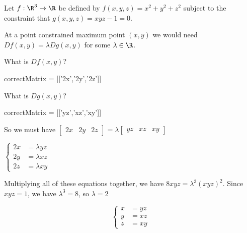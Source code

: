 \documentclass{ximera}
\begin{document}
	\begin{question}
		Let $f:\R^3 \to \R$ be defined by $f(x,y,z) = x^2+y^2+z^2$ subject to the constraint that $g(x,y,z) = xyz -1 = 0 $.  
		\begin{solution}
			\begin{hint}
			    At a point constrained maximum point $(x,y)$ we would need $Df(x,y) = \lambda Dg(x,y)$ for some $\lambda \in \R$.
		    \end{hint}
			\begin{hint}
			\begin{question}
			\begin{solution}
				What is $Df(x,y)$?
					\begin{matrix-answer}
						correctMatrix = [['2x','2y','2z']]
					\end{matrix-answer}
			\end{solution}
			\begin{solution}
				What is $Dg(x,y)$?
					\begin{matrix-answer}
						correctMatrix = [['yz','xz','xy']]
					\end{matrix-answer}
			\end{solution}
			\end{question}
		\end{hint}
			\begin{hint}
				So we must have \(\begin{bmatrix} 2x & 2y & 2z\end{bmatrix} = \lambda \begin{bmatrix} yz & xz & xy\end{bmatrix}\)
			\end{hint}
			\begin{hint}
				\(
					\begin{cases}
						2x &= \lambda yz\\
						2y &= \lambda xz\\
						2z &= \lambda xy
					  \end{cases}
					\)
			\end{hint}
			\begin{hint}
				Multiplying all of these equations together, we have $8xyz  = \lambda^3(xyz)^2$.  Since $xyz=1$, we have $\lambda^3 = 8$, so $\lambda =2$
			\end{hint}
			\begin{hint}
				\[
					\begin{cases}
						x &=  yz\\
						y &=  xz\\
						z &=  xy

\end{cases}\]
\end{hint}
\end{solution}
\end{question}
\end{document}
